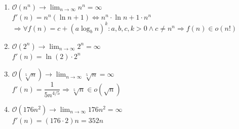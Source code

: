 \documentclass[a4paper,12pt]{article}
\begin{document}
\begin{enumerate}
		\[
			\mathcal{O}(n!) \rightarrow \lim_{n\to\infty}n! = \prod_{n=1}^{k}n \leftrightarrow n \cdot (n-1) \cdot (n-2) \cdot ... \cdot 2 \cdot 1 \Rightarrow n! = n(n-1)! = \infty
		\]\\
			\textbf{$n!$ wächst asymptotisch deutlich schneller als alle anderen hier genannten Funktionen, außer $n^n$ (s.u.)}
		\item $\mathcal{O}(n^n) \rightarrow \lim_{n\to\infty}n^n = \infty$\\
			  $f'(n) = n^n(\ln n + 1) \Leftrightarrow n^n \cdot \ln n + 1 \cdot n^n$\\
			  $\Rightarrow \forall f(n) = c + (a\log_b n)^k :  a,b,c,k > 0 \land c \ne n^n \Rightarrow f(n) \in o(n!)$
		\item $\mathcal{O}(2^n) \rightarrow \lim_{n\to\infty}2^n = \infty$\\
			  $f'(n) = \ln{(2)} \cdot 2^n$
		\item $\mathcal{O}(\sqrt[5]{n}) \rightarrow \lim_{n\to\infty}\sqrt[5]{n} = \infty$\\
			  $f'(n) = \dfrac{1}{5n^{4/5}} \Rightarrow \sqrt[5]{n} \in o(\sqrt{n})$
		\item $\mathcal{O}(176n^2) \rightarrow \lim_{n\to\infty}176n^2 = \infty$\\
			  $f'(n) = (176 \cdot 2)n = 352n$
	\end{enumerate}
\end{document}
